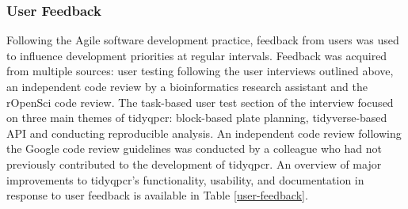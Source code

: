\documentclass[../main.tex]{subfiles}
\begin{document}
\subsubsection{User Feedback}
Following the Agile software development practice, feedback from users was used to influence development priorities at regular intervals. 
Feedback was acquired from multiple sources: user testing following the user interviews outlined above, an independent code review by a bioinformatics research assistant and the rOpenSci code review.
The task-based user test section of the interview focused on three main themes of tidyqpcr: block-based plate planning, tidyverse-based API and conducting reproducible analysis.
An independent code review following the Google code review guidelines was conducted by a colleague who had not previously contributed to the development of tidyqpcr.
An overview of major improvements to tidyqpcr's functionality, usability, and documentation in response to user feedback is available in Table \ref{user-feedback}.


\makeatletter
\renewcommand{\fnum@table}{Table \thetable}
\makeatother
\end{document}
